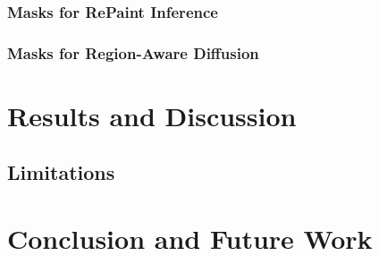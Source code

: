 \documentclass[english,ba]{tudo-sse-thesis}
\begin{document}
\subsection{Masks for RePaint Inference}

\subsection{Masks for Region-Aware Diffusion}


\chapter{Results and Discussion}

\section{Limitations}


\chapter{Conclusion and Future Work}







\end{document}
